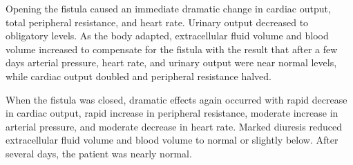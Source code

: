Opening the fistula caused an immediate dramatic change in cardiac output, total peripheral resistance, and heart rate. Urinary output decreased to obligatory levels. As the body adapted, extracellular fluid volume and blood volume increased to compensate for the fistula with the result that after a few days arterial pressure, heart rate, and urinary output were near normal levels, while cardiac output doubled and peripheral resistance halved.

When the fistula was closed, dramatic effects again occurred with rapid decrease in cardiac output, rapid increase in peripheral resistance, moderate increase in arterial pressure, and moderate decrease in heart rate. Marked diuresis reduced extracellular fluid volume and blood volume to normal or slightly below. After several days, the patient was nearly normal.
